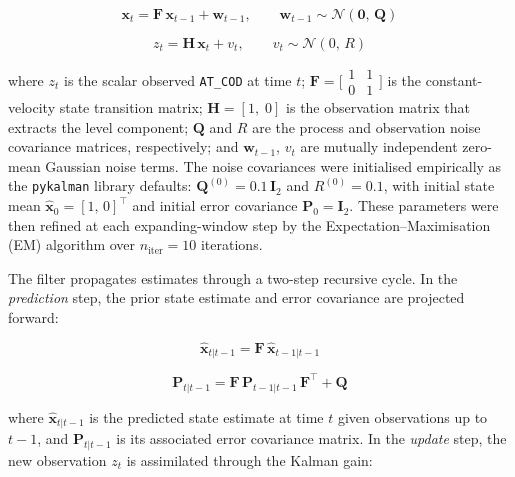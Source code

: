 \documentclass[conference]{IEEEtran}
\begin{document}
\begin{equation}
    \mathbf{x}_t = \mathbf{F}\,\mathbf{x}_{t-1} + \mathbf{w}_{t-1}, \qquad \mathbf{w}_{t-1} \sim \mathcal{N}(\mathbf{0},\,\mathbf{Q})
    \label{eq:kf_state}
\end{equation}

\begin{equation}
    z_t = \mathbf{H}\,\mathbf{x}_t + v_t, \qquad v_t \sim \mathcal{N}(0,\,R)
    \label{eq:kf_obs}
\end{equation}

where $z_t$ is the scalar observed \texttt{AT\_COD} at time $t$; $\mathbf{F} = \bigl[\begin{smallmatrix}1&1\\0&1\end{smallmatrix}\bigr]$ is the constant-velocity state transition matrix; $\mathbf{H} = [1,\;0]$ is the observation matrix that extracts the level component; $\mathbf{Q}$ and $R$ are the process and observation noise covariance matrices, respectively; and $\mathbf{w}_{t-1}$, $v_t$ are mutually independent zero-mean Gaussian noise terms. The noise covariances were initialised empirically as the \texttt{pykalman} library defaults: $\mathbf{Q}^{(0)} = 0.1\,\mathbf{I}_2$ and $R^{(0)} = 0.1$, with initial state mean $\hat{\mathbf{x}}_0 = [1,\,0]^\top$ and initial error covariance $\mathbf{P}_0 = \mathbf{I}_2$. These parameters were then refined at each expanding-window step by the Expectation--Maximisation (EM) algorithm over $n_\text{iter}=10$ iterations.

The filter propagates estimates through a two-step recursive cycle. In the \emph{prediction} step, the prior state estimate and error covariance are projected forward:

\begin{equation}
    \hat{\mathbf{x}}_{t|t-1} = \mathbf{F}\,\hat{\mathbf{x}}_{t-1|t-1}
    \label{eq:kf_predict_state}
\end{equation}

\begin{equation}
    \mathbf{P}_{t|t-1} = \mathbf{F}\,\mathbf{P}_{t-1|t-1}\,\mathbf{F}^\top + \mathbf{Q}
    \label{eq:kf_predict_cov}
\end{equation}

where $\hat{\mathbf{x}}_{t|t-1}$ is the predicted state estimate at time $t$ given observations up to $t-1$, and $\mathbf{P}_{t|t-1}$ is its associated error covariance matrix. In the \emph{update} step, the new observation $z_t$ is assimilated through the Kalman gain:
\end{document}
